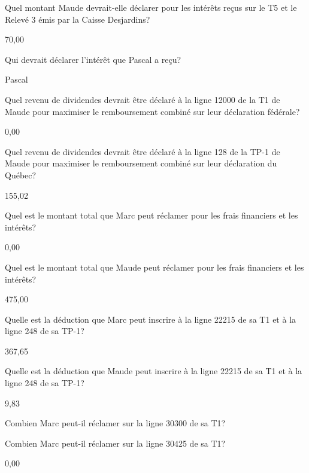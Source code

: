 \begin{question}
	Quel montant Maude devrait-elle déclarer pour les intérêts reçus sur le T5 et le Relevé 3 émis par la Caisse Desjardins?
\end{question}
70,00

\begin{question}
	Qui devrait déclarer l’intérêt que Pascal a reçu?
\end{question}
Pascal

\begin{question}
	Quel revenu de dividendes devrait être déclaré à la ligne 12000 de la T1 de Maude pour maximiser le remboursement combiné sur leur déclaration fédérale?
\end{question}
0,00

\begin{question}
	Quel revenu de dividendes devrait être déclaré à la ligne 128 de la TP-1 de Maude pour maximiser le remboursement combiné sur leur déclaration du Québec?
\end{question}
155,02

\begin{question}
	Quel est le montant total que Marc peut réclamer pour les frais financiers et les intérêts?
\end{question}
0,00

\begin{question}
	Quel est le montant total que Maude peut réclamer pour les frais financiers et les intérêts?
\end{question}
475,00

\begin{question}
	Quelle est la déduction que Marc peut inscrire à la ligne 22215 de sa T1 et à la ligne 248 de sa TP-1?
\end{question}
367,65

\begin{question}
	Quelle est la déduction que Maude peut inscrire à la ligne 22215 de sa T1 et à la ligne 248 de sa TP-1?
\end{question}
9,83

\begin{question}
	Combien Marc peut-il réclamer sur la ligne 30300 de sa T1?
\end{question}

\begin{question}
	Combien Marc peut-il réclamer sur la ligne 30425 de sa T1?
\end{question}
0,00

